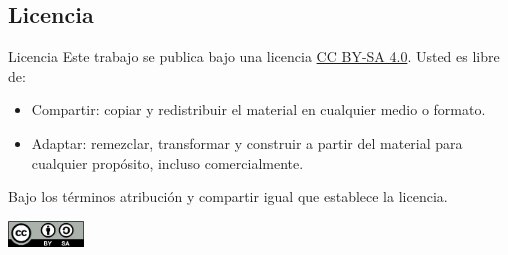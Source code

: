 \documentclass[8pt, t]{beamer}
\begin{document}
\subsection{Licencia}
\label{sec:orgcb7f264}

\begin{frame}[label={sec:org1a07a23}]{Licencia}
Este trabajo se publica bajo una licencia \href{https://creativecommons.org/licenses/by-sa/4.0/}{CC BY-SA 4.0}. Usted es libre de:

\begin{itemize}
\item \alert{Compartir}: copiar y redistribuir el material en cualquier medio o formato.
\item \alert{Adaptar}: remezclar, transformar y construir a partir del material para cualquier propósito, incluso comercialmente.
\end{itemize}

Bajo los términos \alert{atribución} y \alert{compartir igual} que establece la licencia.

\begin{center}
\includegraphics[width=2cm]{core/by-sa.png}
\end{center}
\end{frame}
\end{document}
